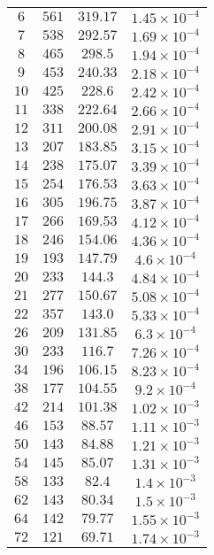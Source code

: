\begin{center}
\begin{table}
\begin{center}
\begin{tabular}{c | c | c | c }
		$6$ & $561$ & $319.17$ & $1.45\times 10^{-4}$ \\ 
		$7$ & $538$ & $292.57$ & $1.69\times 10^{-4}$ \\ 
		$8$ & $465$ & $298.5$ & $1.94\times 10^{-4}$ \\ 
		$9$ & $453$ & $240.33$ & $2.18\times 10^{-4}$ \\ 
		$10$ & $425$ & $228.6$ & $2.42\times 10^{-4}$ \\ 
		$11$ & $338$ & $222.64$ & $2.66\times 10^{-4}$ \\ 
		$12$ & $311$ & $200.08$ & $2.91\times 10^{-4}$ \\ 
		$13$ & $207$ & $183.85$ & $3.15\times 10^{-4}$ \\ 
		$14$ & $238$ & $175.07$ & $3.39\times 10^{-4}$ \\ 
		$15$ & $254$ & $176.53$ & $3.63\times 10^{-4}$ \\ 
		$16$ & $305$ & $196.75$ & $3.87\times 10^{-4}$ \\ 
		$17$ & $266$ & $169.53$ & $4.12\times 10^{-4}$ \\ 
		$18$ & $246$ & $154.06$ & $4.36\times 10^{-4}$ \\ 
		$19$ & $193$ & $147.79$ & $4.6\times 10^{-4}$ \\ 
		$20$ & $233$ & $144.3$ & $4.84\times 10^{-4}$ \\ 
		$21$ & $277$ & $150.67$ & $5.08\times 10^{-4}$ \\ 
		$22$ & $357$ & $143.0$ & $5.33\times 10^{-4}$ \\ 
		$26$ & $209$ & $131.85$ & $6.3\times 10^{-4}$ \\ 
		$30$ & $233$ & $116.7$ & $7.26\times 10^{-4}$ \\ 
		$34$ & $196$ & $106.15$ & $8.23\times 10^{-4}$ \\ 
		$38$ & $177$ & $104.55$ & $9.2\times 10^{-4}$ \\ 
		$42$ & $214$ & $101.38$ & $1.02\times 10^{-3}$ \\ 
		$46$ & $153$ & $88.57$ & $1.11\times 10^{-3}$ \\ 
		$50$ & $143$ & $84.88$ & $1.21\times 10^{-3}$ \\ 
		$54$ & $145$ & $85.07$ & $1.31\times 10^{-3}$ \\ 
		$58$ & $133$ & $82.4$ & $1.4\times 10^{-3}$ \\ 
		$62$ & $143$ & $80.34$ & $1.5\times 10^{-3}$ \\ 
		$64$ & $142$ & $79.77$ & $1.55\times 10^{-3}$ \\ 
		$72$ & $121$ & $69.71$ & $1.74\times 10^{-3}$ \\ 

\end{tabular}
\end{center}
\end{table}
\end{center}

